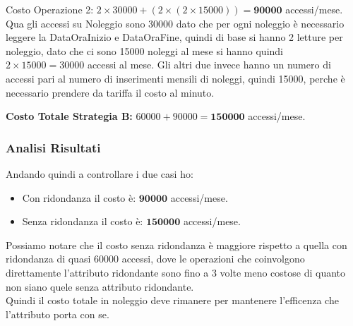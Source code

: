 \documentclass[11pt,a4paper]{article}
\begin{document}
\begin{itemize}
          \vspace{0.1cm}
          \noindent
          Costo Operazione 2: $2\times 30000 + (2\times(2\times15000)) = \mathbf{90000}$ accessi/mese.\\
          Qua gli accessi su Noleggio sono 30000 dato che per ogni noleggio è necessario leggere la DataOraInizio e DataOraFine,
          quindi di base si hanno 2 letture per noleggio, dato che ci sono 15000 noleggi al mese si hanno quindi $2 \times 15000 = 30000$ accessi al mese.
          Gli altri due invece hanno un numero di accessi pari al numero di inserimenti mensili di noleggi, quindi 15000,
          perche è necessario prendere da tariffa il costo al minuto.
          \vspace{0.3cm}
\end{itemize}
\textbf{Costo Totale Strategia B:} $60000 + 90000 = \mathbf{150000}$ accessi/mese. \\
\subsubsection{Analisi Risultati}
Andando quindi a controllare i due casi ho:
\begin{itemize}
    \item Con ridondanza il costo è: $\mathbf{90000}$ accessi/mese.
    \item Senza ridondanza il costo è: $\mathbf{150000}$ accessi/mese.
\end{itemize}
Possiamo notare che il costo senza ridondanza è maggiore rispetto a quella con ridondanza di quasi 60000 accessi,
dove le operazioni che coinvolgono direttamente l'attributo ridondante sono fino a 3 volte meno costose di quanto non siano quele
senza attributo ridondante.\\
Quindi il costo totale in noleggio deve rimanere per mantenere l'efficenza che l'attributo porta con se.
\end{document}

